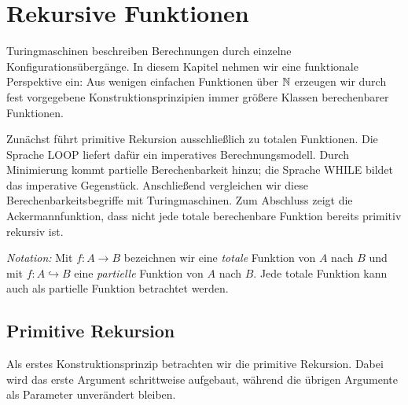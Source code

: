 \section[Rekursive Funktionen]{Rekursive Funktionen}
\label{sec:rekursive-funktionen}

\newcommand{\sub}{\textrm{sub}}
\newcommand{\pred}{\textrm{pred}}

Turingmaschinen beschreiben Berechnungen durch einzelne
Konfigurationsübergänge. In diesem Kapitel nehmen wir eine funktionale
Perspektive ein: Aus wenigen einfachen Funktionen über $\mathbb{N}$ erzeugen wir durch
fest vorgegebene Konstruktionsprinzipien immer größere Klassen berechenbarer
Funktionen.

Zunächst führt primitive Rekursion ausschließlich zu totalen Funktionen.
Die Sprache LOOP liefert dafür ein imperatives Berechnungsmodell. Durch
Minimierung kommt partielle Berechenbarkeit hinzu; die Sprache WHILE bildet das
imperative Gegenstück. Anschließend vergleichen wir diese
Berechenbarkeitsbegriffe mit Turingmaschinen. Zum Abschluss zeigt die
Ackermannfunktion, dass nicht jede totale berechenbare Funktion bereits primitiv
rekursiv ist.

\emph{Notation:} Mit $f: A \to B$ bezeichnen wir eine \emph{totale}
Funktion von $A$ nach $B$ und mit $f:A\hookrightarrow B$ eine
\emph{partielle} Funktion von $A$ nach $B$. Jede totale Funktion kann
auch als partielle Funktion betrachtet werden.

\subsection{Primitive Rekursion}
\label{sec:primitive-rekursion}


Als erstes Konstruktionsprinzip betrachten wir die primitive Rekursion. Dabei
wird das erste Argument schrittweise aufgebaut, während die übrigen Argumente
als Parameter unverändert bleiben.

